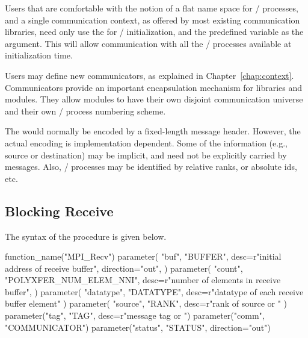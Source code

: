 \begin{users}
Users that are comfortable with the notion of a flat name space for
\MPI/ processes, and a single communication context, as offered by most
existing communication libraries, need only use the \wpm{} for \MPI/ initialization, and the predefined
variable  as the  argument.
This will allow communication with all the \MPI/ processes available at
initialization time.

Users may define new communicators, as explained in Chapter~\ref{chap:context}.
Communicators provide an important encapsulation mechanism for libraries and
modules.  They allow modules to have their own disjoint communication universe
and their own \MPI/ process numbering scheme.
\end{users}

\begin{implementors}
The 
would normally be encoded by a fixed-length message header.
However, the actual encoding
is implementation dependent. Some of the information (e.g.,
source or destination) may be implicit, and need not be
explicitly carried by messages. Also, \MPI/ processes may be identified by
relative ranks, or absolute ids, etc.
\end{implementors}

\subsection{Blocking Receive}
\label{subsec:pt2pt-basicreceive}

The syntax of the  procedure is given below.

\begin{mpi-binding}
    function_name("MPI_Recv")
    parameter(
        "buf",
        "BUFFER",
        desc=r"initial address of receive buffer",
        direction="out",
    )
    parameter(
        "count",
        "POLYXFER_NUM_ELEM_NNI",
        desc=r"number of elements in receive buffer",
    )
    parameter(
        "datatype", "DATATYPE", desc=r"datatype of each receive buffer element"
    )
    parameter(
        "source", "RANK", desc=r"rank of source or "
    )
    parameter("tag", "TAG", desc=r"message tag or ")
    parameter("comm", "COMMUNICATOR")
    parameter("status", "STATUS", direction="out")
\end{mpi-binding}

